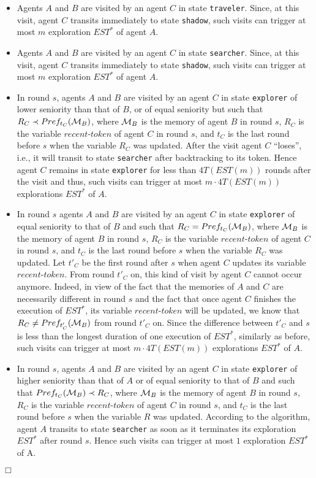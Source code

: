 \documentclass[11pt]{article}
\newcommand{\qed}{\hfill $\Box$ \bigbreak}
\newenvironment{proof}{\noindent {\bf Proof.}}{\qed}
\newcommand{\cM}{{\cal M}}
\begin{document}
\begin{proof}
\begin{itemize}
\item {Agents $A$ and $B$ are visited by an agent $C$ in state {\tt traveler}. Since, at this visit, agent $C$ transits immediately to state {\tt shadow}, such visits can trigger at most $m$ exploration $EST^*$ of agent $A$.} 

\item {Agents $A$ and $B$ are visited by an agent $C$ in state {\tt searcher}. Since, at this visit, agent $C$ transits immediately to state {\tt shadow}, such  visits can trigger at most $m$ exploration $EST^*$ of agent $A$.}

\item {In round $s$, agents $A$ and $B$ are visited by an agent $C$ in state {\tt explorer} of lower seniority than that of $B$, or of equal seniority but such that $R_C \prec Pref_{t_C}(\cM_B)$, where $\cM_B$ is the memory of agent $B$ in round $s$, $R_C$ is the variable $recent$-$token$ of agent $C$ in round $s$, and $t_C$ is the last round before $s$ when the variable $R_C$ was updated. After the visit agent $C$ ``loses'', i.e., it will transit to state {\tt searcher} after backtracking
     to its token. Hence agent $C$ remains in state {\tt explorer} for less than $4T(EST(m))$ rounds after the visit and thus, such visits can trigger at most $m \cdot 4T(EST(m))$ explorations $EST^*$ of $A$.}

\item {In round $s$ agents $A$ and $B$ are visited by an agent $C$ in state {\tt explorer} of equal seniority to that of $B$ and such that $R_C = Pref_{t_C}(\cM_B)$, where $\cM_B$ is the memory of agent $B$ in round $s$, $R_C$ is the variable $recent$-$token$ of agent $C$ in round $s$, and $t_C$ is the last round before $s$ when the variable $R_C$ was updated. Let $t'_C$ be the first round after $s$ when agent $C$ updates its variable $recent$-$token$. From round $t'_C$ on, this kind of visit by agent $C$ cannot occur anymore. Indeed, in view of the fact that the memories of $A$ and $C$ are necessarily different in round $s$ and the fact that once agent $C$ finishes the execution of $EST^*$, its variable $recent$-$token$ will be updated, we know that $R_C \ne Pref_{t'_C}(\cM_B)$ from round $t'_C$ on. Since the difference between $t'_C$ and $s$ is less than the longest duration of one execution of $EST^*$, similarly as before, such visits can trigger at most $m \cdot 4T(EST(m))$  explorations $EST^*$ of $A$.}

\item  {In round $s$, agents $A$ and $B$ are visited by an agent $C$ in state {\tt explorer} of higher seniority than that of $A$ or of equal seniority to that of $B$ and such that $Pref_{t_C}(\cM_B) \prec R_C$, where $\cM_B$ is the memory of agent $B$ in round $s$, $R_C$ is the variable $recent$-$token$ of agent $C$ in round $s$, and $t_C$ is the last round before $s$ when the variable $R$ was updated. According to the algorithm, agent $A$ transits to state {\tt searcher} as soon as it terminates its exploration $EST^*$ after round $s$. Hence such visits can trigger at most $1$ exploration $EST^*$ of A.}
\end{itemize}




\end{proof}
\end{document}
